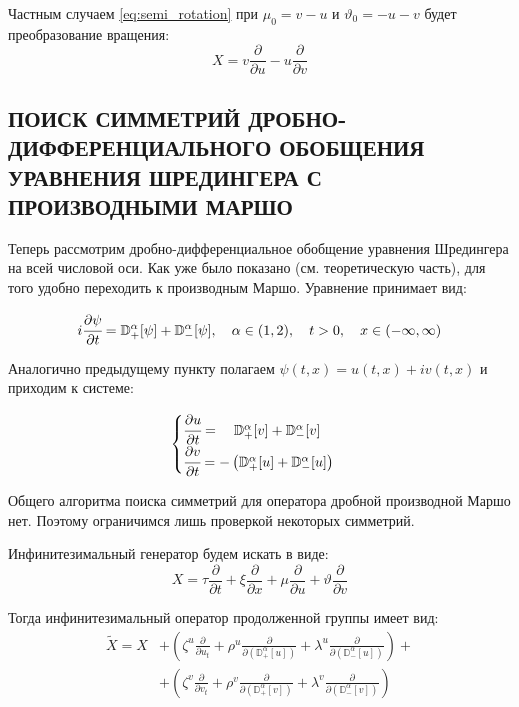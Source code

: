 \documentclass[a4paper, fontsize=14pt]{article}
\newcommand{\MD}[2]{\mathbb{D}_{#1}^{\alpha}[#2]} %
\begin{document}
Частным случаем \eqref{eq:semi_rotation} при $\mu_0 = v - u$ и $\vartheta_0 = -u - v$ будет преобразование вращения:
\begin{equation*}
  X = v \frac{\partial}{\partial u} - u \frac{\partial}{\partial v}
\end{equation*}

\subsection[Поиск симметрий дробно-дифференциального обобщения уравнения Шредингера с производными Маршо]{ПОИСК СИММЕТРИЙ ДРОБНО-ДИФФЕРЕНЦИАЛЬНОГО ОБОБЩЕНИЯ УРАВНЕНИЯ ШРЕДИНГЕРА С ПРОИЗВОДНЫМИ МАРШО}

Теперь рассмотрим дробно-дифференциальное обобщение уравнения Шредингера на всей числовой оси.
Как уже было показано (см. теоретическую часть), для того удобно переходить к производным Маршо.
Уравнение принимает вид:

\begin{equation}
  \label{eq:shredinger_MD_inline}
  i \cfrac{\partial \psi}{\partial t} = \MD{+}{\psi} + \MD{-}{\psi}, \quad \alpha \in (1, 2), \quad t > 0, \quad x \in (-\infty, \infty)
\end{equation}

Аналогично предыдущему пункту полагаем $\psi(t, x) = u(t, x) + i v(t, x)$ и приходим к системе:

\begin{equation}
  \label{eq:shredinger_MD_system}
  \begin{cases}
    \cfrac{\partial u}{\partial t} = \quad \MD{+}{v} + \MD{-}{v} \\
    \cfrac{\partial v}{\partial t} = - \left( \MD{+}{u} + \MD{-}{u} \right)
  \end{cases}
\end{equation}

Общего алгоритма поиска симметрий для оператора дробной производной Маршо нет.
Поэтому ограничимся лишь проверкой некоторых симметрий. 

Инфинитезимальный генератор будем искать в виде:
\begin{equation*}
  X = \tau \frac{\partial}{\partial t}  + \xi \frac{\partial}{\partial x}  + \mu \frac{\partial}{\partial u}  + \vartheta  \frac{\partial}{\partial v}
\end{equation*}

Тогда инфинитезимальный оператор продолженной группы имеет вид:
\begin{equation}
  \label{eq:generator_md}
  \begin{split}
    \tilde{X} = X &+ \left(\zeta^u \frac{\partial }{\partial u_t} + \rho^u \frac{\partial }{\partial (\MD{+}{u})} + \lambda^u \frac{\partial }{\partial (\MD{-}{u})} \right) +\\
    &+\left(\zeta^v \frac{\partial }{\partial v_t}  + \rho^v \frac{\partial }{\partial (\MD{+}{v})}  + \lambda^v \frac{\partial }{\partial (\MD{-}{v})} \right)
  \end{split}
\end{equation}
\end{document}
